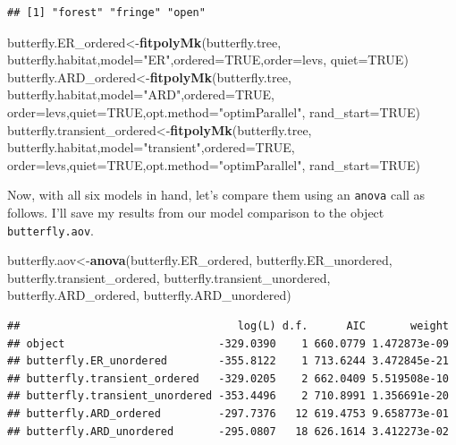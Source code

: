 \documentclass[fleqn,10pt,lineno]{wlpeerj} %
\newenvironment{Shaded}{\begin{snugshade}}{\end{snugshade}}
\newcommand{\AttributeTok}[1]{\textcolor[rgb]{0.13,0.29,0.53}{#1}}
\newcommand{\ConstantTok}[1]{\textcolor[rgb]{0.56,0.35,0.01}{#1}}
\newcommand{\FunctionTok}[1]{\textcolor[rgb]{0.13,0.29,0.53}{\textbf{#1}}}
\newcommand{\NormalTok}[1]{#1}
\newcommand{\OtherTok}[1]{\textcolor[rgb]{0.56,0.35,0.01}{#1}}
\newcommand{\StringTok}[1]{\textcolor[rgb]{0.31,0.60,0.02}{#1}}
\begin{document}
\begin{verbatim}
## [1] "forest" "fringe" "open"
\end{verbatim}

\begin{Shaded}
\begin{Highlighting}[]
\NormalTok{butterfly.ER\_ordered}\OtherTok{\textless{}{-}}\FunctionTok{fitpolyMk}\NormalTok{(butterfly.tree,}
\NormalTok{  butterfly.habitat,}\AttributeTok{model=}\StringTok{"ER"}\NormalTok{,}\AttributeTok{ordered=}\ConstantTok{TRUE}\NormalTok{,}\AttributeTok{order=}\NormalTok{levs,}
  \AttributeTok{quiet=}\ConstantTok{TRUE}\NormalTok{)}
\NormalTok{butterfly.ARD\_ordered}\OtherTok{\textless{}{-}}\FunctionTok{fitpolyMk}\NormalTok{(butterfly.tree,}
\NormalTok{  butterfly.habitat,}\AttributeTok{model=}\StringTok{"ARD"}\NormalTok{,}\AttributeTok{ordered=}\ConstantTok{TRUE}\NormalTok{,}
  \AttributeTok{order=}\NormalTok{levs,}\AttributeTok{quiet=}\ConstantTok{TRUE}\NormalTok{,}\AttributeTok{opt.method=}\StringTok{"optimParallel"}\NormalTok{,}
  \AttributeTok{rand\_start=}\ConstantTok{TRUE}\NormalTok{)}
\NormalTok{butterfly.transient\_ordered}\OtherTok{\textless{}{-}}\FunctionTok{fitpolyMk}\NormalTok{(butterfly.tree,}
\NormalTok{  butterfly.habitat,}\AttributeTok{model=}\StringTok{"transient"}\NormalTok{,}\AttributeTok{ordered=}\ConstantTok{TRUE}\NormalTok{,}
  \AttributeTok{order=}\NormalTok{levs,}\AttributeTok{quiet=}\ConstantTok{TRUE}\NormalTok{,}\AttributeTok{opt.method=}\StringTok{"optimParallel"}\NormalTok{,}
  \AttributeTok{rand\_start=}\ConstantTok{TRUE}\NormalTok{)}
\end{Highlighting}
\end{Shaded}

Now, with all six models in hand, let's compare them using an \texttt{anova} call as follows. I'll save my results from our model comparison to the object \texttt{butterfly.aov}.

\begin{Shaded}
\begin{Highlighting}[]
\NormalTok{butterfly.aov}\OtherTok{\textless{}{-}}\FunctionTok{anova}\NormalTok{(butterfly.ER\_ordered,}
\NormalTok{  butterfly.ER\_unordered,}
\NormalTok{  butterfly.transient\_ordered,}
\NormalTok{  butterfly.transient\_unordered,}
\NormalTok{  butterfly.ARD\_ordered,}
\NormalTok{  butterfly.ARD\_unordered)}
\end{Highlighting}
\end{Shaded}

\begin{verbatim}
##                                  log(L) d.f.      AIC       weight
## object                        -329.0390    1 660.0779 1.472873e-09
## butterfly.ER_unordered        -355.8122    1 713.6244 3.472845e-21
## butterfly.transient_ordered   -329.0205    2 662.0409 5.519508e-10
## butterfly.transient_unordered -353.4496    2 710.8991 1.356691e-20
## butterfly.ARD_ordered         -297.7376   12 619.4753 9.658773e-01
## butterfly.ARD_unordered       -295.0807   18 626.1614 3.412273e-02
\end{verbatim}
\end{document}
